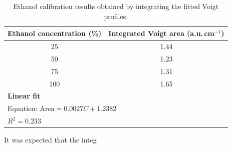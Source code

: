 \documentclass[11pt,a4paper]{article}
\begin{document}
\begin{table}[H]
    \centering
    \caption{Ethanol calibration results obtained by integrating the fitted Voigt profiles.}
    \label{tab:ethanol_voigt_calibration}
    \begin{tabular}{cc}
        \toprule
        \textbf{Ethanol concentration (\%)} &
        \textbf{Integrated Voigt area (a.u.\,cm$^{-1}$)} \\
        \midrule
        25  & 1.44 \\
        50  & 1.23 \\
        75  & 1.31 \\
        100 & 1.65 \\
        \midrule
        \multicolumn{2}{l}{\textbf{Linear fit}} \\
        \multicolumn{2}{l}{Equation: $\mathrm{Area} = 0.0027C + 1.2382$} \\
        \multicolumn{2}{l}{$R^2 = 0.233$} \\
        \bottomrule
    \end{tabular}
\end{table}

It was expected that the integ
\nocite{*}
\newpage


\end{document}
